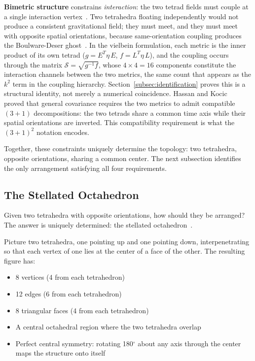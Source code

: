 \documentclass[aps,prd,preprint,superscriptaddress,showpacs,preprintnumbers,amsmath,amssymb,nofootinbib]{revtex4-2}
\begin{document}
\textbf{Bimetric structure} constrains \emph{interaction}: the two tetrad fields must couple at a single interaction vertex~\cite{hinterbichler2012}. Two tetrahedra floating independently would not produce a consistent gravitational field; they must meet, and they must meet with opposite spatial orientations, because same-orientation coupling produces the Boulware-Deser ghost~\cite{boulware1972}. In the vielbein formulation, each metric is the inner product of its own tetrad ($g = E^T\eta\,E$, $f = L^T\eta\,L$), and the coupling occurs through the matrix $\mathcal{S} = \sqrt{g^{-1}f}$, whose $4 \times 4 = 16$ components constitute the interaction channels between the two metrics, the same count that appears as the $k^2$ term in the coupling hierarchy. Section~\ref{subsec:identification} proves this is a structural identity, not merely a numerical coincidence. Hassan and Kocic~\cite{hassankocic2018} proved that general covariance requires the two metrics to admit compatible $(3{+}1)$ decompositions: the two tetrads share a common time axis while their spatial orientations are inverted. This compatibility requirement is what the $(3{+}1)^2$ notation encodes.

Together, these constraints uniquely determine the topology: two tetrahedra, opposite orientations, sharing a common center. The next subsection identifies the only arrangement satisfying all four requirements.

\subsection{The Stellated Octahedron}
\label{subsec:stellated}

Given two tetrahedra with opposite orientations, how should they be arranged? The answer is uniquely determined: the stellated octahedron~\cite{coxeter1973}.

Picture two tetrahedra, one pointing up and one pointing down, interpenetrating so that each vertex of one lies at the center of a face of the other. The resulting figure has:
\begin{itemize}
\item 8 vertices (4 from each tetrahedron)
\item 12 edges (6 from each tetrahedron)
\item 8 triangular faces (4 from each tetrahedron)
\item A central octahedral region where the two tetrahedra overlap
\item Perfect central symmetry: rotating 180$^\circ$ about any axis through the center maps the structure onto itself
\end{itemize}
\end{document}
